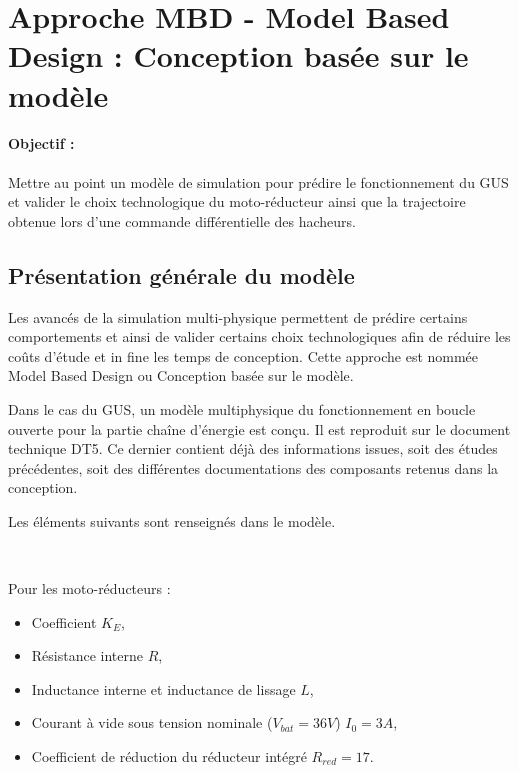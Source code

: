 

\section{Approche MBD - Model Based Design : Conception basée sur le
modèle}

\paragraph{Objectif :} Mettre au point un modèle de simulation pour prédire le fonctionnement du GUS et valider le choix technologique du moto-réducteur ainsi que la trajectoire obtenue lors d'une commande différentielle des hacheurs.

\subsection{Présentation générale du modèle}

Les avancés de la simulation multi-physique permettent de prédire certains comportements et ainsi de valider certains choix technologiques afin de réduire les coûts d'étude et in fine les temps de conception. Cette approche est nommée Model Based Design ou Conception basée sur le
modèle.

Dans le cas du GUS, un modèle multiphysique du fonctionnement en boucle ouverte pour la partie chaîne d'énergie est conçu. Il est reproduit sur le document technique DT5. Ce dernier contient déjà des informations issues, soit des études précédentes, soit des différentes documentations des composants retenus dans la conception.

Les éléments suivants sont renseignés dans le modèle.

~\

Pour les moto-réducteurs :
\begin{itemize}
 \item Coefficient $K_E$,
 \item Résistance interne $R$,
 \item Inductance interne et inductance de lissage $L$,
 \item Courant à vide sous tension nominale ($V_{bat}= 36V$) $I_0=3A$,
 \item Coefficient de réduction du réducteur intégré $R_{red}=17$.
\end{itemize}

